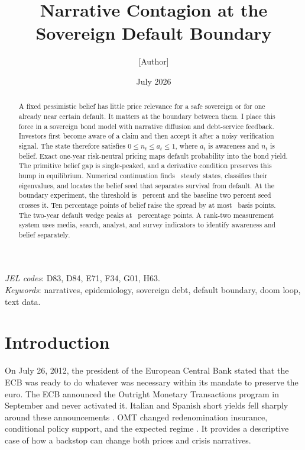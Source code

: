 \documentclass[11pt]{article}
\title{Narrative Contagion at the\\ Sovereign Default Boundary}
\author{[Author]}
\date{July 2026}
\theoremstyle{definition}
\begin{document}
\maketitle

\begin{abstract}
\noindent A fixed pessimistic belief has little price relevance for a safe sovereign or for one already near certain default. It matters at the boundary between them. I place this force in a sovereign bond model with narrative diffusion and debt-service feedback. Investors first become aware of a claim and then accept it after a noisy verification signal. The state therefore satisfies $0\leq n_t\leq a_t\leq1$, where $a_t$ is awareness and $n_t$ is belief. Exact one-year risk-neutral pricing maps default probability into the bond yield. The primitive belief gap is single-peaked, and a derivative condition preserves this hump in equilibrium. Numerical continuation finds \EquilibriumCount\ steady states, classifies their eigenvalues, and locates the belief seed that separates survival from default. At the boundary experiment, the threshold is \SeedThresholdPct\ percent and the baseline two percent seed crosses it. Ten percentage points of belief raise the spread by at most \RelPeakTen\ basis points. The two-year default wedge peaks at \WedgePeak\ percentage points. A rank-two measurement system uses media, search, analyst, and survey indicators to identify awareness and belief separately.
\end{abstract}

\medskip
\noindent\textit{JEL codes}: D83, D84, E71, F34, G01, H63.\\
\noindent\textit{Keywords}: narratives, epidemiology, sovereign debt, default boundary, doom loop, text data.

\section{Introduction}\label{sec:intro}

On July 26, 2012, the president of the European Central Bank stated that the ECB was ready to do whatever was necessary within its mandate to preserve the euro. The ECB announced the Outright Monetary Transactions program in September and never activated it. Italian and Spanish short yields fell sharply around these announcements \citep{AltavillaEtAl2016}. OMT changed redenomination insurance, conditional policy support, and the expected regime \citep{KrishnamurthyEtAl2018}. It provides a descriptive case of how a backstop can change both prices and crisis narratives.
\end{document}
